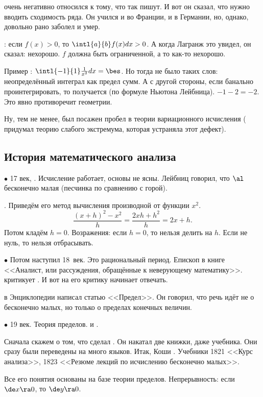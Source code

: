 \documentclass[a4paper,oneside,fleqn,10pt]{article}
\begin{document}
 очень негативно относился к тому, что так пишут. И вот он сказал,
что нужно вводить сходимость ряда. Он учился и во Франции, и в Германии,
но, однако, довольно рано заболел и умер.

: если $f(x) > 0$, то $\intl{a}{b} f(x) dx > 0$.
А когда Лагранж это увидел, он сказал: нехорошо. $f$ должна быть ограниченной,
а то как-то нехорошо.

Пример : $\intl{-1}{1} \frac{1}{x^2}dx = \bes$.
Но тогда не было таких слов: неопределённый интеграл как предел сумм.
А с другой стороны, если банально проинтегрировать, то получается (по формуле Ньютона Лейбница).
$-1-2 = -2$. Это явно противоречит геометрии.

Ну, тем не менее, был посажен пробел в теории вариационного исчисления ( придумал
теорию слабого экстремума, которая устраняла этот дефект).

\subsection{История математического анализа}

$\bullet$ 17 век, . Исчисление работает, основы не ясны. Лейбниц говорил, что $\al$ бесконечно
малая (песчинка по сравнению с горой).

. Приведём его метод вычисления производной от функции $x^2$.
$$\frac{(x+h)^2 - x^2}{h} = \frac{2xh + h^2}{h} = 2x + h.$$
Потом кладём $h = 0$. Возражения: если $h = 0$, то нельзя делить на $h$. Если не нуль, то
нельзя отбрасывать.

$\bullet$ Потом наступил 18~век. Это рациональный период. Епископ 
в книге <<Аналист, или рассуждения, обращённые к неверующему математику>>.
критикует . И вот на его критику начинает отвечать.

 в Энциклопедии написал статью <<Предел>>. Он говорил,
что речь идёт не о бесконечно малых, но только о пределах конечных величин.

$\bullet$ 19 век. Теория пределов.  и .

Сначала скажем о том, что сделал .
Он накатал две книжки, даже учебника. Они сразу были переведены на много
языков. Итак, Коши . Учебники 1821 <<Курс анализа>>,
1823 <<Резюме лекций по исчислению бесконечно малых>>.

Все его понятия основаны на базе теории пределов.
Непрерывность: если $\de x \ra 0$, то $\de y \ra 0$.
\end{document}
